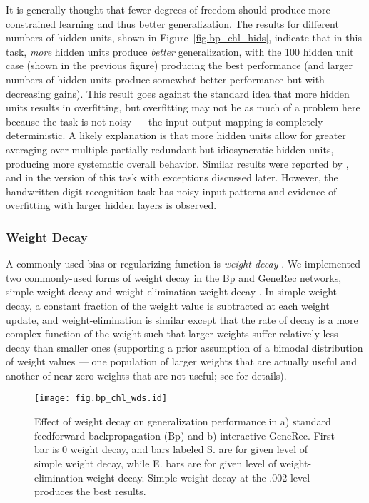\documentclass[12pt,twoside]{article}
\begin{document}
It is generally thought that fewer degrees of freedom should produce
more constrained learning and thus better generalization.  The results
for different numbers of hidden units, shown in
Figure~\ref{fig.bp_chl_hids}, indicate that in this task, {\em more}
hidden units produce {\em better} generalization, with the 100 hidden
unit case (shown in the previous figure) producing the best
performance (and larger numbers of hidden units produce somewhat
better performance but with decreasing gains).  This result goes
against the standard idea that more hidden units results in
overfitting, but overfitting may not be as much of a problem here
because the task is not noisy --- the input-output mapping is
completely deterministic.  A likely explanation is that more hidden
units allow for greater averaging over multiple partially-redundant
but idiosyncratic hidden units, producing more systematic overall
behavior.  Similar results were reported by , and in
the version of this task with exceptions discussed later.  However,
the handwritten digit recognition task has noisy input patterns and
evidence of overfitting with larger hidden layers is observed.

\subsubsection{Weight Decay}

A commonly-used bias or regularizing function is {\em weight decay}
\cite[e.g.,]{Hinton89b,WeigendRumelhartHuberman91}.  We implemented
two commonly-used forms of weight decay in the Bp and GeneRec
networks, simple weight decay and weight-elimination weight decay
\cite{WeigendRumelhartHuberman91}.  In simple weight decay, a constant
fraction of the weight value is subtracted at each weight update, and
weight-elimination is similar except that the rate of decay is a more
complex function of the weight such that larger weights suffer
relatively less decay than smaller ones (supporting a prior assumption
of a bimodal distribution of weight values --- one population of
larger weights that are actually useful and another of near-zero
weights that are not useful; see 
for details).

\begin{figure}
  \centering\texttt{[image: fig.bp\_chl\_wds.id]}
  \caption{\small Effect of weight decay on generalization
    performance in a) standard feedforward backpropagation (Bp) and b)
    interactive GeneRec.  First bar is 0 weight decay, and bars
    labeled S. are for given level of simple weight decay, while E.
    bars are for given level of weight-elimination weight decay.
    Simple weight decay at the .002 level produces the best results.}
  \label{fig.bp_chl_wds}
\end{figure}
\end{document}
